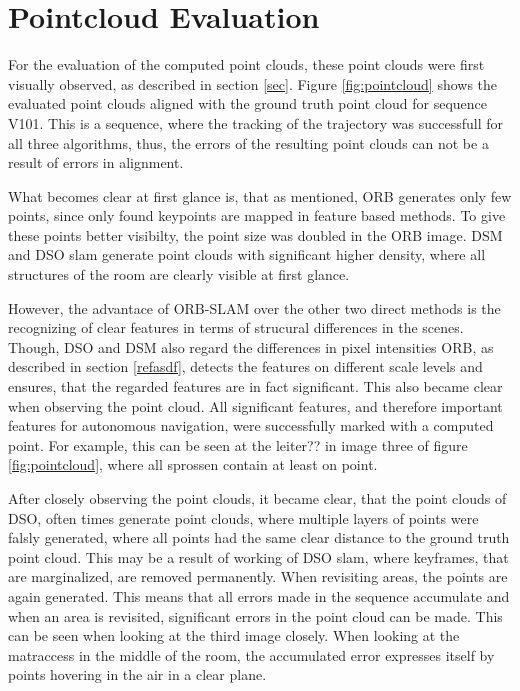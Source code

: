 	
	


\section{Pointcloud Evaluation}

For the evaluation of the computed point clouds, these point clouds were first visually observed, as described in section \ref{sec}. 
Figure \ref{fig:pointcloud} shows the evaluated point clouds aligned with the ground truth point cloud for sequence V101. This is a sequence, 
where the tracking of the trajectory was successfull for all three algorithms, thus, the errors of the resulting point clouds can not 
be a result of errors in alignment. 

What becomes clear at first glance is, that as mentioned, ORB generates only few points, since only found keypoints are mapped in feature based methods.
 To give these  points better visibilty, the point size was doubled in the ORB image. DSM and DSO slam generate point clouds with significant higher 
 density, where all structures of the room are clearly visible at first glance. 
 
 However, the advantace of ORB-SLAM over the other two direct methods 
 is the recognizing of clear features in terms of strucural differences in the scenes. Though, DSO and DSM also regard the differences in pixel intensities
 ORB, as described in section \ref{refasdf}, detects the features on different scale levels and ensures, that the regarded features are in fact significant. 
 This also became clear when observing the point cloud. All significant features, and therefore important features for autonomous navigation, were successfully 
 marked with a computed point. For example, this can be seen at the leiter?? in image three of figure \ref{fig:pointcloud}, where all sprossen contain at least 
 on point. 

 
 After closely observing the point clouds, it became clear, that the point clouds of DSO, often times generate point clouds, where multiple layers of 
 points were falsly generated, where all points had the same clear distance to the ground truth point cloud. This may be a result of working of DSO slam, 
 where keyframes, that are marginalized, are removed permanently. When revisiting areas, the points are again generated. This means that all errors made
 in the sequence accumulate and when an area is revisited, significant errors in the point cloud can be made. This can be seen when looking at the 
 third image closely. When looking at the matraccess in the middle of the room, the accumulated error expresses itself by points hovering in the air 
 in a clear plane. 
 
